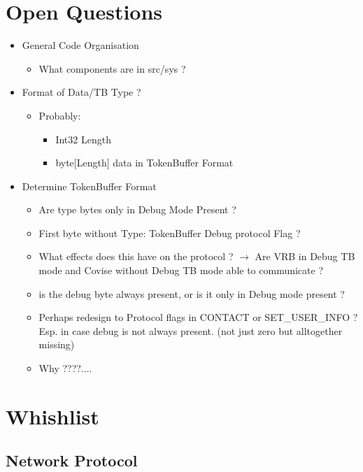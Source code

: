 \documentclass[12pt,pdftex,a4paper]{scrbook}
\begin{document}
	\chapter{Open Questions}

	\begin{itemize}
		\item General Code Organisation
		\begin{itemize}
			\item What components are in src/sys ?
		\end{itemize}
		\item Format of Data/TB Type ?
		\begin{itemize}
			\item Probably:
			\begin{itemize}
				\item Int32 Length
				\item byte[Length] data in TokenBuffer Format
			\end{itemize}
		\end{itemize}
		\item Determine TokenBuffer Format
		\begin{itemize}
			\item Are type bytes only in Debug Mode Present ?
			\item First byte without Type: TokenBuffer Debug protocol Flag ?
			\item What effects does this have on the protocol ? $\rightarrow$ Are VRB in Debug TB mode and Covise without Debug TB mode able to communicate ?
			\item is the debug byte always present, or is it only in Debug mode present ?
			\item Perhaps redesign to Protocol flags in CONTACT or SET\_USER\_INFO ? Esp. in case debug is not always present. (not just zero but alltogether missing)
			\item Why ????....
		\end{itemize}
	\end{itemize}

	\chapter{Whishlist}
	
	\section{Network Protocol}
	
\end{document}
